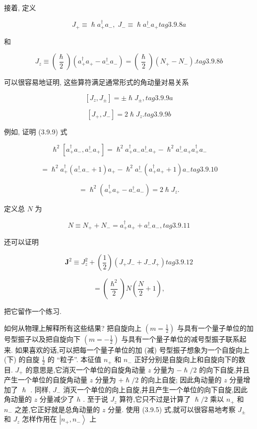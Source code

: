 接着, 定义

$$
{J}_{ + } \equiv \hslash {a}_{ + }^{ \dagger }{a}_{ - },\;{J}_{ - } \equiv \hslash {a}_{ - }^{ \dagger }{a}_{ + } tag{3.9.8a}
$$

和

$$
{J}_{z} \equiv \left( \frac{\hslash }{2}\right) \left( {{a}_{ + }^{ \dagger }{a}_{ + } - {a}_{ - }^{ \dagger }{a}_{ - }}\right) = \left( \frac{\hslash }{2}\right) \left( {{N}_{ + } - {N}_{ - }}\right) . tag{3.9.8b}
$$

可以很容易地证明, 这些算符满足通常形式的角动量对易关系

$$
\left\lbrack {{J}_{z},{J}_{ \pm }}\right\rbrack = \pm \hslash {J}_{ \pm }, tag{3.9.9a}
$$

$$
\left\lbrack {{J}_{ + },{J}_{ - }}\right\rbrack = 2\hslash {J}_{z}. tag{3.9.9b}
$$

例如, 证明 (3.9.9) 式

$$
{\hslash }^{2}\left\lbrack {{a}_{ + }^{ \dagger }{a}_{ - },{a}_{ - }^{ \dagger }{a}_{ + }}\right\rbrack = {\hslash }^{2}{a}_{ + }^{ \dagger }{a}_{ - }{a}_{ - }^{ \dagger }{a}_{ + } - {\hslash }^{2}{a}_{ - }^{ \dagger }{a}_{ + }{a}_{ + }^{ \dagger }{a}_{ - }
$$

$$
= {\hslash }^{2}{a}_{ + }^{ \dagger }\left( {{a}_{ - }^{ \dagger }{a}_{ - } + 1}\right) {a}_{ + } - {\hslash }^{2}{a}_{ - }^{ \dagger }\left( {{a}_{ + }^{ \dagger }{a}_{ + } + 1}\right) {a}_{ - } tag{3.9.10}
$$

$$
= {\hslash }^{2}\left( {{a}_{ + }^{ \dagger }{a}_{ + } - {a}_{ - }^{ \dagger }{a}_{ - }}\right) = 2\hslash {J}_{z}.
$$

定义总 $N$ 为

$$
N \equiv {N}_{ + } + {N}_{ - } = {a}_{ + }^{ \dagger }{a}_{ + } + {a}_{ - }^{ \dagger }{a}_{ - }, tag{3.9.11}
$$

还可以证明

$$
{\mathbf{J}}^{2} \equiv {J}_{z}^{2} + \left( \frac{1}{2}\right) \left( {{J}_{ + }{J}_{ - } + {J}_{ - }{J}_{ + }}\right) tag{3.9.12}
$$

$$
= \left( \frac{{\hslash }^{2}}{2}\right) N\left( {\frac{N}{2} + 1}\right) ,
$$

把它留作一个练习.

如何从物理上解释所有这些结果? 把自旋向上 $\left( {m = \frac{1}{2}}\right)$ 与具有一个量子单位的加号型振子以及把自旋向下 $\left( {m = - \frac{1}{2}}\right)$ 与具有一个量子单位的减号型振子联系起来. 如果喜欢的话,可以把每一个量子单位的加 (减) 号型振子想象为一个自旋向上 (下) 的自旋 $\frac{1}{2}$ 的 “粒子”. 本征值 ${n}_{ + }$ 和 ${n}_{ - }$ 正好分别是自旋向上和自旋向下的数目. ${J}_{ + }$ 的意思是,它消灭一个单位的自旋角动量 $z$ 分量为 $- \hslash /2$ 的向下自旋,并且产生一个单位的自旋角动量 $z$ 分量为 $+ \hslash /2$ 的向上自旋; 因此角动量的 $z$ 分量增加了 $\hslash$ . 同样, ${J}_{ - }$ 消灭一个单位的向上自旋,并且产生一个单位的向下自旋,因此角动量的 $z$ 分量减少了 $h$ . 至于说 ${J}_{z}$ 算符,它只不过是计算了 $\hslash /2$ 乘以 ${n}_{ + }$ 和 ${n}_{ - }$ 之差,它正好就是总角动量的 $z$ 分量. 使用 (3.9.5) 式,就可以很容易地考察 ${J}_{ \pm }$ 和 ${J}_{z}$ 怎样作用在 $\left| {{n}_{ + },{n}_{ - }}\right\rangle$ 上

